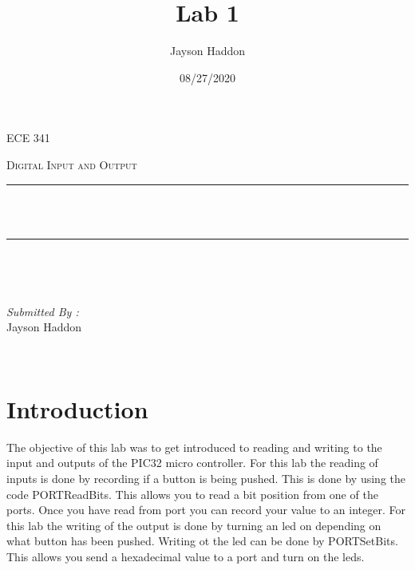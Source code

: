 \documentclass[11pt,a4]{report}
\title{Lab 1}
\author{Jayson Haddon}
\date{08/27/2020}
\makeatletter
\let\thetitle\@title
\makeatother
\begin{document}

\begin{titlepage}
	\centering
    \vspace*{0.5 cm}
\begin{center}    \textsc{\Large   ECE 341 }\\[2.0 cm]	\end{center}%
	\textsc{\Large Digital Input and Output  }\\[0.5 cm]				%
	\rule{\linewidth}{0.2 mm} \\[0.4 cm]
	{ \huge \bfseries \thetitle}\\
	\rule{\linewidth}{0.2 mm} \\[1.5 cm]
	
	\begin{minipage}{0.4\textwidth}
		\begin{flushleft} \large
			\end{flushleft}
			\end{minipage}~
			\begin{minipage}{0.4\textwidth}
            
			\begin{flushright} \large
			\emph{Submitted By :} \\
			Jayson Haddon  
		\end{flushright}
           
	\end{minipage}\\[2 cm]
	
    
    
    
    
	
\end{titlepage}


\renewcommand{\thesection}{\arabic{section}}
\section{Introduction}
The objective of this lab was to get introduced to reading and writing to the input and outputs of the PIC32 micro controller. For this lab the reading of inputs is done by recording if a button is being pushed. This is done by using the code PORTReadBits. This allows you to read a bit position from one of the ports. Once you have read from port you can record your value to an integer. For this lab the writing of the output is done by turning an led on depending on what button has been pushed. Writing ot the led can be done by PORTSetBits. This allows you send a hexadecimal value to a port and turn on the leds. 
\end{document}
